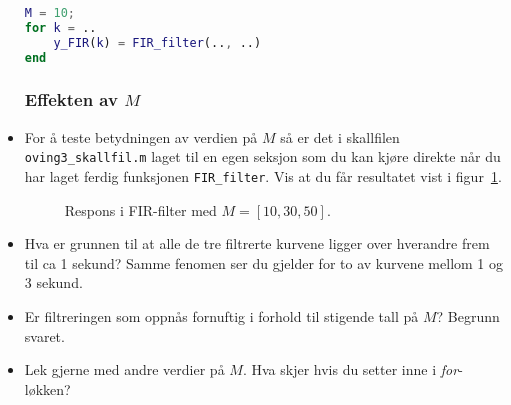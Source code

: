 \begin{itemize}
\begin{lstlisting}[caption={Syntaks for å kalle funksjonen {\tt FIR\_filter}.},
 language= Matlab,   label=kode:FIR_funk_kall,
numbers=none] 
M = 10;
for k = ..
    y_FIR(k) = FIR_filter(.., ..)
end
\end{lstlisting}


\subsubsection*{Effekten av $M$}
  
\item   For å teste betydningen av verdien på $M$ så
  er det i skallfilen {\tt oving3\_skallfil.m} laget til en egen
  seksjon som du kan kjøre direkte når du har laget ferdig funksjonen
  {\tt FIR\_filter}.  
  Vis at du får resultatet vist i  figur~\ref{fig:3i2}. 

    \begin{figure}[H]
      \centering
      \hspace*{0mm}
      \caption{Respons i FIR-filter med $M{=}[10, 30, 50]$. }
      \label{fig:3i2}
    \end{figure}

    \item Hva er grunnen til at alle de tre filtrerte kurvene ligger over hverandre frem til
      ca 1 sekund? Samme fenomen ser du gjelder for 
      to av kurvene mellom 1 og 3 sekund. 

    \item  Er filtreringen som oppnås fornuftig i forhold til stigende
      tall på $M$? Begrunn svaret.

      \item Lek gjerne med andre verdier på $M$. Hva skjer hvis du
        setter  inne i {\it for}-løkken? 
\end{itemize}

